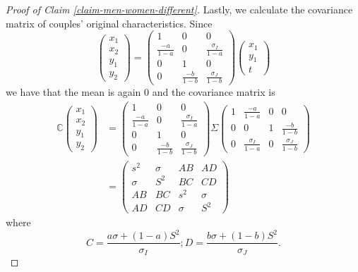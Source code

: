\documentclass[
]{article}
\theoremstyle{definition}
\theoremstyle{definition}
\theoremstyle{definition}
\theoremstyle{definition}
\theoremstyle{remark}
\begin{document}
\begin{proof}[Proof of Claim \ref{claim-men-women-different}]
Lastly, we calculate the covariance matrix of couples' original characteristics.
Since
\[
\left(\begin{array}{c}
x_{1}\\
x_{2}\\
y_{1}\\
y_{2}
\end{array}\right)=\left(\begin{array}{ccc}
1 & 0 & 0\\
\frac{-a}{1-a} & 0 & \frac{\sigma_{I}}{1-a}\\
0 & 1 & 0\\
0 & \frac{-b}{1-b} & \frac{\sigma_{J}}{1-b}
\end{array}\right)\left(\begin{array}{c}
x_{1}\\
y_{1}\\
t
\end{array}\right)
\]
we have that the mean is again 0 and the covariance matrix is 
\begin{align*}
\mathbb{C}\left(\begin{array}{c}
x_{1}\\
x_{2}\\
y_{1}\\
y_{2}
\end{array}\right) & =\left(\begin{array}{ccc}
1 & 0 & 0\\
\frac{-a}{1-a} & 0 & \frac{\sigma_{I}}{1-a}\\
0 & 1 & 0\\
0 & \frac{-b}{1-b} & \frac{\sigma_{J}}{1-b}
\end{array}\right)\Sigma\left(\begin{array}{cccc}
1 & \frac{-a}{1-a} & 0 & 0\\
0 & 0 & 1 & \frac{-b}{1-b}\\
0 & \frac{\sigma_{I}}{1-a} & 0 & \frac{\sigma_{J}}{1-b}
\end{array}\right)\\
 & =\left(\begin{array}{cccc}
s^{2} & \sigma & AB & AD\\
\sigma & S^{2} & BC & CD\\
AB & BC & s^{2} & \sigma\\
AD & CD & \sigma & S^{2}
\end{array}\right)
\end{align*}
where
\[
C=\frac{a\sigma+(1-a)S^{2}}{\sigma_{I}};D=\frac{b\sigma+(1-b)S^{2}}{\sigma_{J}}.
\]


\end{proof}
\end{document}
